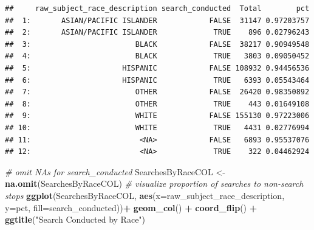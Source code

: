 \documentclass[
]{book}
\newenvironment{Shaded}{\begin{snugshade}}{\end{snugshade}}
\newcommand{\CommentTok}[1]{\textcolor[rgb]{0.56,0.35,0.01}{\textit{#1}}}
\newcommand{\DataTypeTok}[1]{\textcolor[rgb]{0.13,0.29,0.53}{#1}}
\newcommand{\KeywordTok}[1]{\textcolor[rgb]{0.13,0.29,0.53}{\textbf{#1}}}
\newcommand{\NormalTok}[1]{#1}
\newcommand{\OperatorTok}[1]{\textcolor[rgb]{0.81,0.36,0.00}{\textbf{#1}}}
\newcommand{\StringTok}[1]{\textcolor[rgb]{0.31,0.60,0.02}{#1}}
\begin{document}
\begin{Shaded}
\end{Shaded}

\begin{verbatim}
##     raw_subject_race_description search_conducted  Total        pct
##  1:       ASIAN/PACIFIC ISLANDER            FALSE  31147 0.97203757
##  2:       ASIAN/PACIFIC ISLANDER             TRUE    896 0.02796243
##  3:                        BLACK            FALSE  38217 0.90949548
##  4:                        BLACK             TRUE   3803 0.09050452
##  5:                     HISPANIC            FALSE 108932 0.94456536
##  6:                     HISPANIC             TRUE   6393 0.05543464
##  7:                        OTHER            FALSE  26420 0.98350892
##  8:                        OTHER             TRUE    443 0.01649108
##  9:                        WHITE            FALSE 155130 0.97223006
## 10:                        WHITE             TRUE   4431 0.02776994
## 11:                         <NA>            FALSE   6893 0.95537076
## 12:                         <NA>             TRUE    322 0.04462924
\end{verbatim}

\begin{Shaded}
\begin{Highlighting}[]
\CommentTok{# omit NAs for search_conducted}
\NormalTok{SearchesByRaceCOL <-}\StringTok{ }\KeywordTok{na.omit}\NormalTok{(SearchesByRaceCOL) }
\CommentTok{# visualize proportion of searches to non-search stops}
\KeywordTok{ggplot}\NormalTok{(SearchesByRaceCOL, }\KeywordTok{aes}\NormalTok{(}\DataTypeTok{x=}\NormalTok{raw_subject_race_description, }\DataTypeTok{y=}\NormalTok{pct, }\DataTypeTok{fill=}\NormalTok{search_conducted))}\OperatorTok{+}\StringTok{ }\KeywordTok{geom_col}\NormalTok{() }\OperatorTok{+}\StringTok{ }\KeywordTok{coord_flip}\NormalTok{() }\OperatorTok{+}\StringTok{ }\KeywordTok{ggtitle}\NormalTok{(}\StringTok{"Search Conducted by Race"}\NormalTok{)}
\end{Highlighting}
\end{Shaded}
\end{document}
